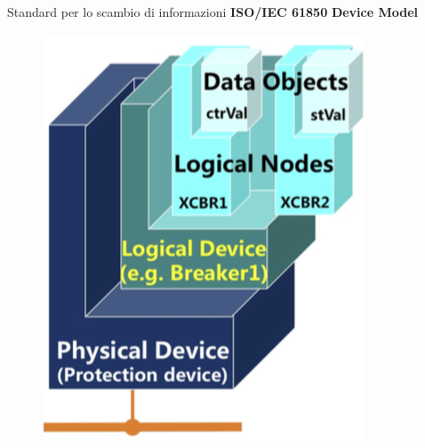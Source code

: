 \begin{frame}{Standard per lo scambio di informazioni}
\textbf{ISO/IEC 61850}
	\newline\textbf{Device Model}
	\begin{figure}[h] 
		\includegraphics[scale=0.35,cfbox=blue_slides 1pt 0pt]{imgs/iec61850ln.png}
	\end{figure}
\end{frame}

